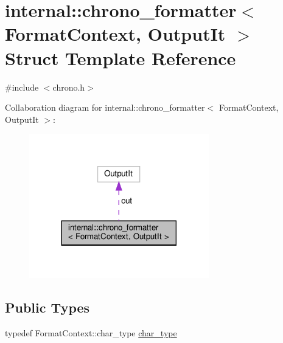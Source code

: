 \hypertarget{structinternal_1_1chrono__formatter}{}\section{internal\+:\+:chrono\+\_\+formatter$<$ Format\+Context, Output\+It $>$ Struct Template Reference}
\label{structinternal_1_1chrono__formatter}


{\ttfamily \#include $<$chrono.\+h$>$}



Collaboration diagram for internal\+:\+:chrono\+\_\+formatter$<$ Format\+Context, Output\+It $>$\+:
\nopagebreak
\begin{figure}[H]
\begin{center}
\leavevmode
\includegraphics[width=221pt]{structinternal_1_1chrono__formatter__coll__graph}
\end{center}
\end{figure}
\subsection*{Public Types}
\begin{DoxyCompactItemize}
\item 
typedef Format\+Context\+::char\+\_\+type \hyperlink{structinternal_1_1chrono__formatter_a48a141d8bc5a48a0c24e19780ba65512}{char\+\_\+type}
\end{DoxyCompactItemize}
